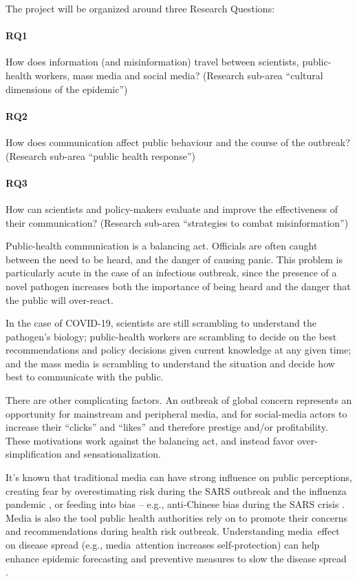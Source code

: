 The project will be organized around three Research Questions:

\paragraph{RQ1} How does information (and misinformation) travel between scientists, public-health workers, mass media and social media? (Research sub-area ``cultural dimensions of the epidemic'')

\paragraph{RQ2} How does communication affect public behaviour and the course of the outbreak? (Research sub-area ``public health response'') 

\paragraph{RQ3} How can scientists and policy-makers evaluate and improve the effectiveness of their communication? (Research sub-area ``strategies to combat misinformation'')


Public-health communication is a balancing act. Officials are often caught between the need to be heard, and the danger of causing panic. This problem is particularly acute in the case of an infectious outbreak, since the presence of a novel pathogen increases both the importance of being heard and the danger that the public will over-react. 

In the case of COVID-19, scientists are still scrambling to understand the pathogen's biology; public-health workers are scrambling to decide on the best recommendations and policy decisions given current knowledge at any given time; and the mass media is scrambling to understand the situation and decide how best to communicate with the public. 

There are other complicating factors. An outbreak of global concern represents an opportunity for mainstream and peripheral media, and for social-media actors to increase their ``clicks'' and ``likes'' and therefore prestige and/or profitability. These motivations work against the balancing act, and instead favor over-simplification and sensationalization.

It's known that traditional media can have strong influence on public perceptions, creating fear by overestimating risk during the SARS outbreak \citep{BerrWalf07} and the influenza pandemic \citep{TuchDube11}, or feeding into bias -- e.g., anti-Chinese bias during the SARS crisis \citep{HuanLeun06}.  Media is also the tool public health authorities rely on to promote their concerns and recommendations during health risk outbreak.  Understanding media effect on disease spread (e.g., media attention increases self-protection) can help enhance epidemic forecasting and preventive measures to slow the disease spread \citep{KimFast19}.  

